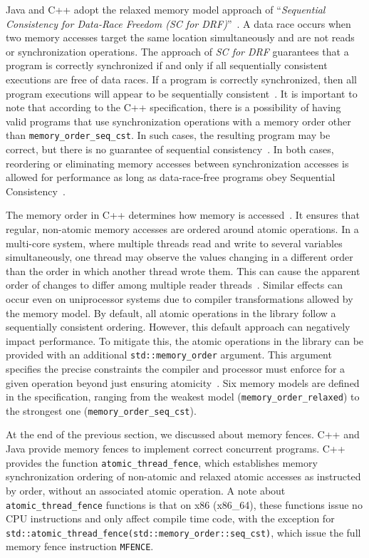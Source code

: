 Java and C++ adopt the relaxed memory model approach of ``\emph{Sequential Consistency for Data-Race Freedom (SC for DRF)}''~\cite{DBLP_conf_isca_AdveH90}.  A data race occurs when two memory accesses target the same location simultaneously and are not reads or synchronization operations. The approach of \emph{SC for DRF} guarantees that a program is correctly synchronized if and only if all sequentially consistent executions are free of data races. If a program is correctly synchronized, then all program executions will appear to be sequentially consistent~\cite{javamemorymodelspec}. It is important to note that according to the C++ specification, there is a possibility of having valid programs that use synchronization operations with a memory order other than \texttt{memory\_order\_seq\_cst}. In such cases, the resulting program may be correct, but there is no guarantee of sequential consistency~\cite{DBLP_conf_pldi_BoehmA08}. In both cases, reordering or eliminating memory accesses between synchronization accesses is allowed for performance as long as data-race-free programs obey Sequential Consistency~\cite{DBLP_series_synthesis_2020Nagarajan}.

The memory order in C++ determines how memory is accessed~\cite{memoryOrderCpp2020}. It ensures that regular, non-atomic memory accesses are ordered around atomic operations. In a multi-core system, where multiple threads read and write to several variables simultaneously, one thread may observe the values changing in a different order than the order in which another thread wrote them. This can cause the apparent order of changes to differ among multiple reader threads~\cite{memoryOrderCpp2020}. Similar effects can occur even on uniprocessor systems due to compiler transformations allowed by the memory model. By default, all atomic operations in the library follow a sequentially consistent ordering. However, this default approach can negatively impact performance. To mitigate this, the atomic operations in the library can be provided with an additional \texttt{std::memory\_order} argument. This argument specifies the precise constraints the compiler and processor must enforce for a given operation beyond just ensuring atomicity~\cite{memoryOrderCpp2020}. Six memory models are defined in the specification, ranging from the weakest model (\texttt{memory\_order\_relaxed}) to the strongest one (\texttt{memory\_order\_seq\_cst}).

At the end of the previous section, we discussed about memory fences. C++ and Java provide memory fences to implement correct concurrent programs. C++ provides the function \texttt{atomic\_thread\_fence}, which establishes memory synchronization ordering of non-atomic and relaxed atomic accesses as instructed by order, without an associated atomic operation. A note about \texttt{atomic\_thread\_fence} functions is that on x86 (x86\_64), these functions issue no CPU instructions and only affect compile time code, with the exception for \texttt{std::atomic\_thread\_fence(std::memory\_order::seq\_cst)}, which issue the full memory fence instruction \texttt{MFENCE}. 

